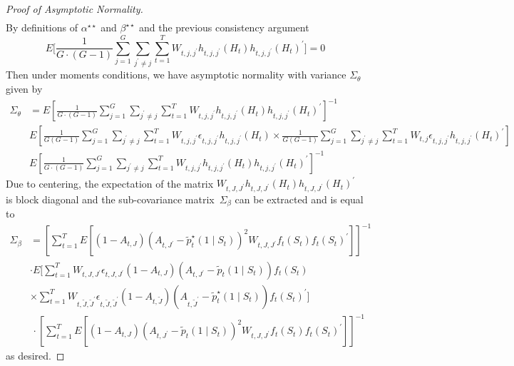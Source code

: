 \documentclass[12pt]{article}
\begin{document}
\begin{proof}[Proof of Asymptotic Normality]
\begin{align*}
\end{align*}
By definitions of $\alpha^{\star \star}$ and $\beta^{\star \star}$  and the previous consistency argument
\[
E \bigg[
  \frac{1}{G \cdot (G-1)} \sum_{j=1}^G \sum_{j^\prime \neq j} \sum_{t=1}^T W_{t,j,j^\prime} h_{t,j,j^\prime}(H_t)
  h_{t,j,j^\prime}(H_t)^\prime \bigg]  = 0
\]
Then under moments conditions, we have asymptotic normality with variance $\Sigma_{\theta}$ given by
\begin{align*}
\Sigma_{\theta} &= E \left[ \frac{1}{G \cdot (G-1)} \sum_{j=1}^G \sum_{j^\prime \neq j} \sum_{t=1}^T W_{t,j,j^\prime} h_{t,j,j^\prime}(H_t) h_{t,j,j^\prime}(H_t)^\prime \right]^{-1} \\
                &E \left[ \frac{1}{G (G-1)} \sum_{j=1}^G \sum_{j^\prime \neq j} \sum_{t=1}^T W_{t,j, j^\prime} \epsilon_{t,j, j^\prime} h_{t,j, j^\prime}(H_t)
                  \times  \frac{1}{G(G-1)} \sum_{j=1}^G \sum_{j^\prime \neq j} \sum_{t=1}^T W_{t,j} \epsilon_{t,j, j^\prime} h_{t,j, j^\prime}(H_t)^\prime \right] \\
                &E \left[ \frac{1}{G \cdot (G-1)} \sum_{j=1}^G \sum_{j^\prime \neq j} \sum_{t=1}^T W_{t,j,j^\prime} h_{t,j,j^\prime}(H_t)
  h_{t,j,j^\prime}(H_t)^\prime  \right]^{-1}
\end{align*}
Due to centering, the expectation of the matrix
$W_{t,J, J^\prime} h_{t,J,J^\prime}(H_t) h_{t,J, J^\prime} (H_t)^\prime$ is block diagonal and
the sub-covariance matrix~$\Sigma_{\beta}$ can be extracted and is equal to
\begin{align*}
 \Sigma_{\beta} &=  \left[ \sum_{t=1}^T E[ (1- A_{t,J}) (A_{t,J^\prime} - \tilde{p}_t^\star (1 \mid S_t)
                  )^2 W_{t,J, J^\prime} f_t (S_t) f_t (S_t)^\prime ] \right]^{-1} \\
  &\cdot E \bigg[ \sum_{t=1}^T W_{t,J, J^\prime} \epsilon_{t,J, J^\prime}
                  (1-A_{t,J}) (A_{t,J^\prime} - \tilde{p}_t( 1 \mid S_t)) f_t(S_t) \\
          &\times  \sum_{t=1}^T W_{t,\tilde  J, \tilde J^\prime} \epsilon_{t, \tilde J, \tilde J^\prime}
                  (1-A_{t,\tilde J}) (A_{t,\tilde J^\prime} - \tilde{p}_t^\star( 1 \mid S_t)) f_t(S_t)^\prime
                  \bigg] \\
 &\, \cdot \left[ \sum_{t=1}^T E[ (1-A_{t,J}) (A_{t,J^\prime} - \tilde{p}_t (1 \mid S_t)
                  )^2 W_{t,J,J^\prime} f_t (S_t) f_t (S_t)^\prime ] \right]^{-1}
\end{align*}
as desired.
\end{proof}
\end{document}

